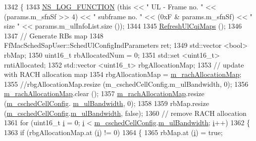 \begin{DoxyCode}
1342 \{
1343   \hyperlink{log-macros-disabled_8h_a90b90d5bad1f39cb1b64923ea94c0761}{NS\_LOG\_FUNCTION} (\textcolor{keyword}{this} << \textcolor{stringliteral}{" UL - Frame no. "} << (params.m\_sfnSf >> 4) << \textcolor{stringliteral}{" subframe no. "} 
      << (0xF & params.m\_sfnSf) << \textcolor{stringliteral}{" size "} << params.m\_ulInfoList.size ());
1344 
1345   \hyperlink{classns3_1_1TdMtFfMacScheduler_a47bec4787d691dc59c6dcded669f213a}{RefreshUlCqiMaps} ();
1346 
1347   \textcolor{comment}{// Generate RBs map}
1348   FfMacSchedSapUser::SchedUlConfigIndParameters ret;
1349   std::vector <bool> rbMap;
1350   uint16\_t rbAllocatedNum = 0;
1351   std::set <uint16\_t> rntiAllocated;
1352   std::vector <uint16\_t> rbgAllocationMap;
1353   \textcolor{comment}{// update with RACH allocation map}
1354   rbgAllocationMap = \hyperlink{classns3_1_1TdMtFfMacScheduler_a10f3c18ee02b2d7f688c010eba536b26}{m\_rachAllocationMap};
1355   \textcolor{comment}{//rbgAllocationMap.resize (m\_cschedCellConfig.m\_ulBandwidth, 0);}
1356   \hyperlink{classns3_1_1TdMtFfMacScheduler_a10f3c18ee02b2d7f688c010eba536b26}{m\_rachAllocationMap}.clear ();
1357   \hyperlink{classns3_1_1TdMtFfMacScheduler_a10f3c18ee02b2d7f688c010eba536b26}{m\_rachAllocationMap}.resize (\hyperlink{classns3_1_1TdMtFfMacScheduler_a585412f686e33f49dad1003e5d2216f0}{m\_cschedCellConfig}.
      \hyperlink{structns3_1_1FfMacCschedSapProvider_1_1CschedCellConfigReqParameters_a5ab5b102878e6e7e7727a14af4a64d2f}{m\_ulBandwidth}, 0);
1358 
1359   rbMap.resize (\hyperlink{classns3_1_1TdMtFfMacScheduler_a585412f686e33f49dad1003e5d2216f0}{m\_cschedCellConfig}.\hyperlink{structns3_1_1FfMacCschedSapProvider_1_1CschedCellConfigReqParameters_a5ab5b102878e6e7e7727a14af4a64d2f}{m\_ulBandwidth}, \textcolor{keyword}{false});
1360   \textcolor{comment}{// remove RACH allocation}
1361   \textcolor{keywordflow}{for} (uint16\_t \hyperlink{bernuolliDistribution_8m_a6f6ccfcf58b31cb6412107d9d5281426}{i} = 0; \hyperlink{bernuolliDistribution_8m_a6f6ccfcf58b31cb6412107d9d5281426}{i} < \hyperlink{classns3_1_1TdMtFfMacScheduler_a585412f686e33f49dad1003e5d2216f0}{m\_cschedCellConfig}.\hyperlink{structns3_1_1FfMacCschedSapProvider_1_1CschedCellConfigReqParameters_a5ab5b102878e6e7e7727a14af4a64d2f}{m\_ulBandwidth}; 
      \hyperlink{bernuolliDistribution_8m_a6f6ccfcf58b31cb6412107d9d5281426}{i}++)
1362     \{
1363       \textcolor{keywordflow}{if} (rbgAllocationMap.at (\hyperlink{bernuolliDistribution_8m_a6f6ccfcf58b31cb6412107d9d5281426}{i}) != 0)
1364         \{
1365           rbMap.at (\hyperlink{bernuolliDistribution_8m_a6f6ccfcf58b31cb6412107d9d5281426}{i}) = \textcolor{keyword}{true};

\end{DoxyCode}
